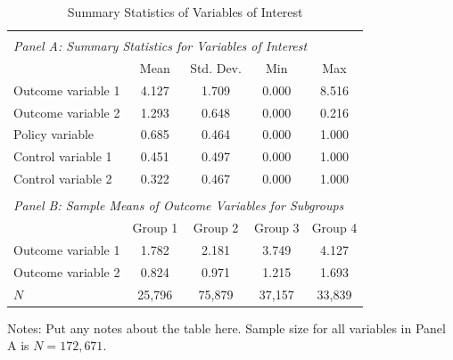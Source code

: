 \documentclass[12pt,english]{article}
\begin{document}
\begin{table}[ht]
\caption{Summary Statistics of Variables of Interest}
\label{tab:descriptives} 
\centering
\begin{threeparttable}
\begin{tabular}{lcccc}
&&&&\\
\multicolumn{5}{l}{\emph{Panel A: Summary Statistics for Variables of Interest}}\\
\toprule
                                                        & Mean  & Std. Dev. & Min   & Max   \\
\midrule
Outcome variable 1                                      & 4.127 & 1.709     & 0.000 & 8.516 \\
Outcome variable 2                                      & 1.293 & 0.648     & 0.000 & 0.216 \\
Policy variable                                         & 0.685 & 0.464     & 0.000 & 1.000 \\
Control variable 1                                      & 0.451 & 0.497     & 0.000 & 1.000 \\
Control variable 2                                      & 0.322 & 0.467     & 0.000 & 1.000 \\
&&&&\\
\multicolumn{5}{l}{\emph{Panel B: Sample Means of Outcome Variables for Subgroups}}\\
\midrule
                                                        & Group 1 & Group 2 & Group 3 & Group 4 \\
\midrule
Outcome variable 1                                      & 1.782  & 2.181  & 3.749  & 4.127  \\
Outcome variable 2                                      & 0.824  & 0.971  & 1.215  & 1.693  \\
\midrule
$N$                                                     & 25,796 & 75,879 & 37,157 & 33,839 \\
\bottomrule
\end{tabular}
\footnotesize Notes: Put any notes about the table here. Sample size for all variables in Panel A is $N=172,671$.
\end{threeparttable}
\end{table}
\end{document}
